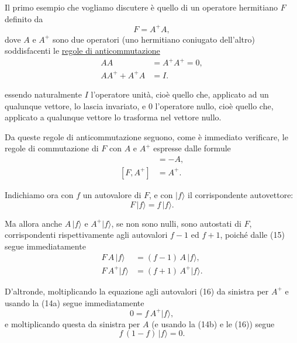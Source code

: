 \documentclass[11pt, a4paper]{book}
\numberwithin{equation}{section}
\begin{document}
Il primo esempio che vogliamo discutere è quello di un operatore hermitiano
$F$ definito da
\begin{equation}
F = A^+A,
\end{equation}
dove $A$ e $A^+$ sono due operatori (uno hermitiano coniugato dell'altro)
soddisfacenti le \uline{regole di anticommutazione}
\begin{align}
AA &= A^+A^+ = 0, \tag{14a} \\
AA^+ + A^+A &= I. \tag{14b}
\end{align}


essendo naturalmente $I$ l'operatore unità, cioè quello che, applicato ad
un qualunque vettore, lo lascia invariato, e $0$ l'operatore nullo, cioè
quello che, applicato a qualunque vettore lo trasforma nel vettore nullo.

Da queste regole di anticommutazione seguono, come è immediato
verificare, le regole di commutazione di $F$ con $A$ e $A^+$ espresse
dalle formule
\begin{align}
[F, A]   &= -A,    \tag{15a} \\
[F, A^+] &= A^+.   \tag{15b}
\end{align}

Indichiamo ora con $f$ un autovalore di $F$, e con $|f\rangle$ il
corrispondente autovettore:
\begin{equation}
F\,|f\rangle = f\,|f\rangle.
\end{equation}

Ma allora anche $A\,|f\rangle$ e $A^+|f\rangle$, se non sono nulli, sono
autostati di $F$, corrispondenti rispettivamente agli autovalori $f-1$ ed
$f+1$, poiché dalle (15) segue immediatamente
\begin{align}
F\,A\,|f\rangle   &= (f-1)\,A\,|f\rangle,   \tag{17a} \\
F\,A^+|f\rangle   &= (f+1)\,A^+|f\rangle.   \tag{17b}
\end{align}

D'altronde, moltiplicando la equazione agli autovalori (16) da sinistra
per $A^+$ e usando la (14a) segue immediatamente
\begin{equation}
0 = f\,A^+|f\rangle,
\end{equation}
e moltiplicando questa da sinistra per $A$ (e usando la (14b) e le (16))
segue
\begin{equation}
f\,(1-f)\,|f\rangle = 0.
\end{equation}
\end{document}
